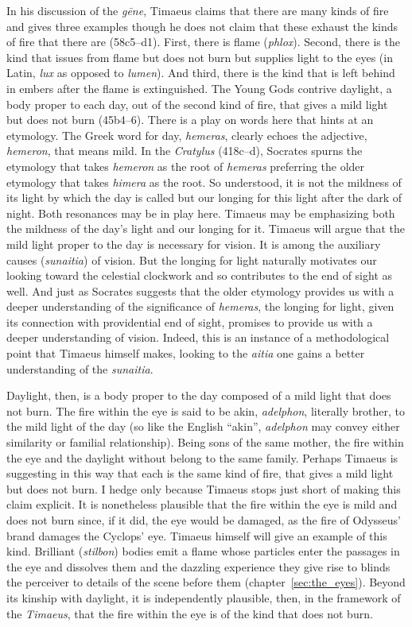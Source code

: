 In his discussion of the \emph{gēne}, Timaeus claims that there are many kinds of fire and gives three examples though he does not claim that these exhaust the kinds of fire that there are (58c5–d1). First, there is flame (\emph{phlox}). Second, there is the kind that issues from flame but does not burn but supplies light to the eyes (in Latin, \emph{lux} as opposed to \emph{lumen}). And third, there is the kind that is left behind in embers after the flame is extinguished. The Young Gods contrive daylight, a body proper to each day, out of the second kind of fire, that gives a mild light but does not burn (45b4--6). There is a play on words here that hints at an etymology. The Greek word for day, \emph{hemeras}, clearly echoes the adjective, \emph{hemeron}, that means mild. In the \emph{Cratylus} (418c--d), Socrates spurns the etymology that takes \emph{hemeron} as the root of \emph{hemeras} preferring the older etymology that takes \emph{himera} as the root. So understood, it is not the mildness of its light by which the day is called but our longing for this light after the dark of night. Both resonances may be in play here. Timaeus may be emphasizing both the mildness of the day's light and our longing for it. Timaeus will argue that the mild light proper to the day is necessary for vision. It is among the auxiliary causes (\emph{sunaitia}) of vision. But the longing for light naturally motivates our looking toward the celestial clockwork and so contributes to the end of sight as well. And just as Socrates suggests that the older etymology provides us with a deeper understanding of the significance of \emph{hemeras}, the longing for light, given its connection with providential end of sight, promises to provide us with a deeper understanding of vision. Indeed, this is an instance of a methodological point that Timaeus himself makes, looking to the \emph{aitia} one gains a better understanding of the \emph{sunaitia}.

Daylight, then, is a body proper to the day composed of a mild light that does not burn. The fire within the eye is said to be akin, \emph{adelphon}, literally brother, to the mild light of the day (so like the English ``akin'', \emph{adelphon} may convey either similarity or familial relationship). Being sons of the same mother, the fire within the eye and the daylight without belong to the same family. Perhaps Timaeus is suggesting in this way that each is the same kind of fire, that gives a mild light but does not burn. I hedge only because Timaeus stops just short of making this claim explicit. It is nonetheless plausible that the fire within the eye is mild and does not burn since, if it did, the eye would be damaged, as the fire of Odysseus' brand damages the Cyclops' eye. Timaeus himself will give an example of this kind. Brilliant (\emph{stilbon}) bodies emit a flame whose particles enter the passages in the eye and dissolves them and the dazzling experience they give rise to blinds the perceiver to details of the scene before them (chapter~\ref{sec:the_eyes}). Beyond its kinship with daylight, it is independently plausible, then, in the framework of the \emph{Timaeus}, that the fire within the eye is of the kind that does not burn.

